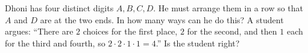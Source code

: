 Dhoni has four distinct digits $A,B,C,D$. He must arrange them in a row so that $A$ and $D$ are at the two ends. In how many ways can he do this? A student argues: ``There are $2$ choices for the first place, $2$ for the second, and then $1$ each for the third and fourth, so $2\cdot2\cdot1\cdot1=4$.'' Is the student right?
